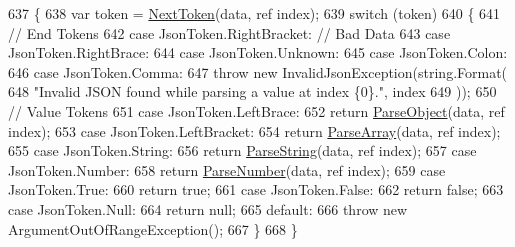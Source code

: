 \begin{DoxyCode}
637         \{
638             var token = \hyperlink{a00046_a1d2daab9b052b186da7a2b6711be5803}{NextToken}(data, ref index);
639             \textcolor{keywordflow}{switch} (token)
640             \{
641                 \textcolor{comment}{// End Tokens}
642                 \textcolor{keywordflow}{case} JsonToken.RightBracket:    \textcolor{comment}{// Bad Data}
643                 \textcolor{keywordflow}{case} JsonToken.RightBrace:
644                 \textcolor{keywordflow}{case} JsonToken.Unknown:
645                 \textcolor{keywordflow}{case} JsonToken.Colon:
646                 \textcolor{keywordflow}{case} JsonToken.Comma:
647                     \textcolor{keywordflow}{throw} \textcolor{keyword}{new} InvalidJsonException(\textcolor{keywordtype}{string}.Format(
648                             \textcolor{stringliteral}{"Invalid JSON found while parsing a value at index \{0\}."}, index
649                             ));
650                 \textcolor{comment}{// Value Tokens}
651                 \textcolor{keywordflow}{case} JsonToken.LeftBrace:
652                     \textcolor{keywordflow}{return} \hyperlink{a00046_a49577a43cf31e147b6d46ea28f7f617e}{ParseObject}(data, ref index);
653                 \textcolor{keywordflow}{case} JsonToken.LeftBracket:
654                     \textcolor{keywordflow}{return} \hyperlink{a00046_ae0b95fd2671c34c64b6a2c6275d69111}{ParseArray}(data, ref index);
655                 \textcolor{keywordflow}{case} JsonToken.String:
656                     \textcolor{keywordflow}{return} \hyperlink{a00046_a7e18de40259814b5ab9d0100bdeab4fe}{ParseString}(data, ref index);
657                 \textcolor{keywordflow}{case} JsonToken.Number:
658                     \textcolor{keywordflow}{return} \hyperlink{a00046_ae0f7085f6d03e4e5cfcba42467cbd0b8}{ParseNumber}(data, ref index);
659                 \textcolor{keywordflow}{case} JsonToken.True:
660                     \textcolor{keywordflow}{return} \textcolor{keyword}{true};
661                 \textcolor{keywordflow}{case} JsonToken.False:
662                     \textcolor{keywordflow}{return} \textcolor{keyword}{false};
663                 \textcolor{keywordflow}{case} JsonToken.Null:
664                     \textcolor{keywordflow}{return} null;
665                 \textcolor{keywordflow}{default}:
666                     \textcolor{keywordflow}{throw} \textcolor{keyword}{new} ArgumentOutOfRangeException();
667             \}
668         \}
\end{DoxyCode}
